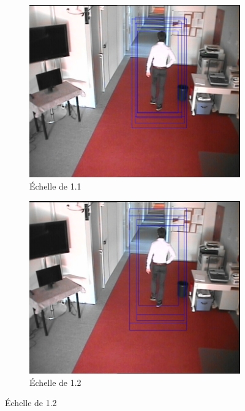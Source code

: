 \documentclass[12pt]{article}
\begin{document}
\begin{figure}[!ht]
	\centering
	\begin{subfigure}{.25\textwidth}
		\centering
		\includegraphics[clip=true,trim=300 100 150 0,width=\linewidth]{img/multiscale11.png}
		\caption{Échelle de 1.1}
	\end{subfigure}
	\begin{subfigure}{.25\textwidth}
		\centering
		\includegraphics[clip=true,trim=300 100 150 0,width=\linewidth]{img/multiscale12.png}
		\caption{Échelle de 1.2}
	\end{subfigure}

\end{figure}
\end{document}
